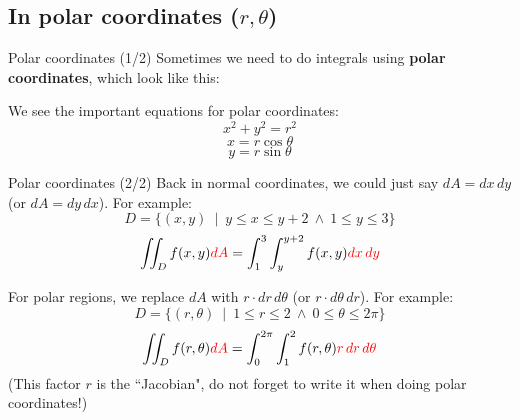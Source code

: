 \subsection{In polar coordinates ($r,\theta$)}
\begin{frame}{Polar coordinates (1/2)}
    Sometimes we need to do integrals using \textbf{polar coordinates}, which look like this:

    \vspace{0.3mm}
    \begin{minipage}{0.6\textwidth}
    
    \end{minipage}
    \begin{minipage}{0.35\textwidth}
        We see the important equations for polar coordinates:
        \[\boxed{x^2+y^2=r^2}\]
        \[\boxed{x=r\cos\theta}\]
        \[\boxed{y=r\sin\theta}\]
    \end{minipage}
\end{frame}

\begin{frame}{Polar coordinates (2/2)}
    Back in normal coordinates, we could just say $dA=dx\,dy$ (or $dA=dy\,dx$). For example:
    \[D=\{(x,y)~\mid~y\leq x\leq y+2~\land~1\leq y\leq 3\}\]
    \[\iint_D f(x,y) \textcolor{red}{dA} = \int_{1}^{3}\int_{y}^{y+2}f(x,y)\textcolor{red}{dx\,dy}\]

    For polar regions, we replace $dA$ with $r\cdot dr\,d\theta$ (or $r\cdot d\theta\, dr$). For example:
    \[D=\{(r,\theta)~\mid~1\leq r\leq 2~\land~0\leq\theta\leq2\pi\}\]
    \[\iint_D f(r,\theta) \textcolor{red}{dA} = \int_{0}^{2\pi}\int_{1}^{2}f(r,\theta)\textcolor{red}{r\,dr\,d\theta}\]
     (This factor $r$ is the ``Jacobian", do not forget to write it when doing polar coordinates!)
\end{frame}



